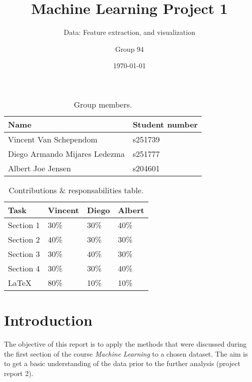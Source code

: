 \documentclass[dtu]{dtuarticle}
\title{Machine Learning Project 1}
\subtitle{Data: Feature extraction, and visualization}
\author{Group 94}
\date{\today}
\begin{document}
	\maketitle

	\begin{table}[h!]
		\renewcommand{\arraystretch}{1.3} %
		\centering
		\begin{tabular}{l | l}
			\textbf{Name}                 & \textbf{Student number} \\ \hline\hline
			Vincent Van Schependom        & s251739                 \\ \hline
			Diego Armando Mijares Ledezma & s251777                 \\ \hline
			Albert Joe Jensen             & s204601
		\end{tabular}
		\caption{Group members.}
		\label{table:members}
	\end{table}

	\begin{table}[h!]
		\renewcommand{\arraystretch}{1.3} %
		\centering
		\begin{tabular}{l | *{3}{|l}}
			\textbf{Task} & \textbf{Vincent} & \textbf{Diego} & \textbf{Albert} \\ \hline\hline
			Section 1     & 30\%             & 30\%           & 40\%            \\ \hline
			Section 2     & 40\%             & 30\%           & 30\%            \\ \hline
			Section 3     & 30\%             & 40\%           & 30\%            \\ \hline
			Section 4     & 30\%             & 30\%           & 40\%			\\ \hline
			\LaTeX        & 80\%             & 10\%           & 10\%
		\end{tabular}
		\caption{Contributions \& responsabilities table.}
		\label{table:contributions}
	\end{table}

	\section*{Introduction}

	The objective of this report is to apply the methods that were discussed during the first
	section of the course \textit{Machine Learning} \cite{book} to a chosen dataset. The aim is to get
	a basic understanding of the data prior to the further analysis (project report 2).
\end{document}
